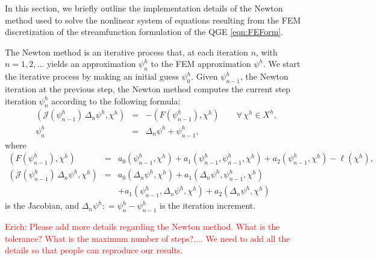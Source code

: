 In this section, we briefly outline the implementation details of the Newton method used to solve the nonlinear system of equations resulting from the FEM discretization of the streamfunction formulation of the QGE \eqref{eqn:FEForm}.

The Newton method is an iterative process that, at each iteration $n$, with $n=1, 2, \dots$ yields an approximation $\psi^h_n$ to the FEM approximation $\psi^h$.
We start the iterative process by making an initial guess $\psi^h_0$.  
Given $\psi^h_{n-1}$, the Newton iteration at the previous step, the Newton method computes the current step iteration $\psi^h_n$ according to the following formula:
\begin{eqnarray}
  \left(
  \mathcal{J}(\psi^h_{n-1}) \, \Delta_n \psi^h , \chi^h
  \right)
  &=& - 
  \left(
  F(\psi^h_{n-1}) , \chi^h
  \right)
  \qquad
  \forall \, \chi^h \in X^h ,
  \label{eqn:Newton} \\[0.2cm]
  \psi^h_n &=& \Delta_n \psi^h + \psi^h_{n-1},
  \label{eqn:NewPsi}
\end{eqnarray}
where 
\begin{eqnarray*}
  \left(
  F(\psi^h_{n-1}) , \chi^h
  \right)
  &=&  a_0(\psi^h_{n-1},\chi^h) + a_1(\psi^h_{n-1},\psi^h_{n-1},\chi^h) + a_2(\psi^h_{n-1},\chi^h) - \ell(\chi^h), \\[0.2cm]
  \left(
  \mathcal{J}(\psi^h_{n-1}) \, \Delta_n \psi^h , \chi^h
  \right)
  &=& a_0(\Delta_n \psi^h,\chi^h) 
  + a_1(\Delta_n \psi^h,\psi^h_{n-1},\chi^h) 
  \nonumber \\[0.2cm]
  && + a_1(\psi^h_{n-1},\Delta_n \psi^h,\chi^h) 
  + a_2(\Delta_n \psi^h,\chi^h)
\end{eqnarray*}
is the Jacobian, and
$\Delta_n \psi^h : = \psi^h_n - \psi^h_{n-1}$ is the iteration increment.

\textcolor{red}{Erich: Please add more details regarding the Newton method.  What is the tolerance?  What is the maximum number of steps?.... We need to add all the details so that people can reproduce our results.}